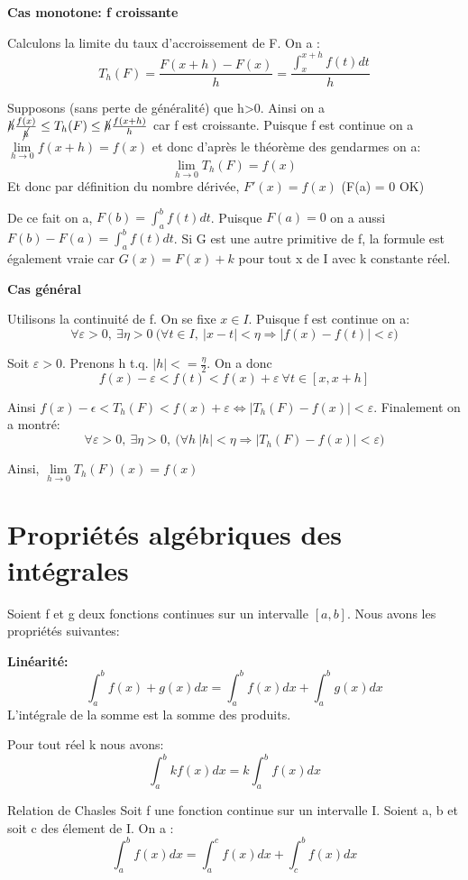 \begin{Proof}
  \textbf{Cas monotone: f croissante}

  Calculons la limite du taux d'accroissement de F. On a :
  \[
    T_h(F) = \frac{F(x+h)-F(x)}{h} = \frac{\int_x^{x+h} f(t) dt}{h}
  \]

  Supposons (sans perte de généralité) que h>0. Ainsi on a $\cancel{h}
  \frac{f(x)}{\cancel{h}} \leq T_h(F) \leq \cancel h \frac{f(x+h)}{h}$
  car f est croissante. Puisque f est continue on a $\lim
  \limits_{h\to 0} f(x+h) = f(x)$ et donc d'après le théorème des
  gendarmes on a:
  \[
    \lim \limits_{h \to 0} T_h(F) = f(x)
  \]
  Et donc par définition du nombre dérivée, $F'(x) = f(x)$ (F(a) = 0 OK)

  De ce fait on a, $F(b) = \int_a^b f(t) dt$. Puisque $F(a) = 0$ on a
  aussi $F(b)-F(a) = \int_a^b f(t)dt$. Si G est une autre primitive de
  f, la formule est également vraie car $G(x) = F(x)+k$ pour tout x de
  I avec k constante réel.

  \textbf{Cas général}
  
  Utilisons la continuité de f. On se fixe $x \in I$. Puisque f est continue on a:
  \[
    \forall \varepsilon>0, ~ \exists \eta>0 ~\big( \forall t \in I,~ |x-t|<\eta
    \Rightarrow |f(x)-f(t)|<\varepsilon \big)
  \]

  Soit $\varepsilon >0$. Prenons h t.q. $|h|<=\frac{\eta}{2}$. On a donc
  \[
    f(x) - \varepsilon < f(t) < f(x) + \varepsilon ~ \forall t \in [x,x+h]
  \]

  Ainsi $f(x)-\epsilon < T_h(F) < f(x)+\varepsilon \Leftrightarrow
  |T_h(F) - f(x)| < \varepsilon $. Finalement on a montré:
  \[
    \forall \varepsilon > 0, ~ \exists \eta>0,~\big( \forall h ~ |h| < \eta
    \Rightarrow |T_h(F) - f(x)|<\varepsilon \big) 
  \]

  Ainsi, $\lim \limits_{h \to 0} T_h(F)(x) = f(x)$
\end{Proof}

\section{Propriétés algébriques des intégrales}
Soient f et g deux fonctions continues sur un intervalle $[a,b]$. Nous avons les
propriétés suivantes: 

\textbf{Linéarité: }
\[
  \int_a^b f(x) + g(x) dx = \int_a^b f(x) dx + \int_a^b g(x)dx
\]
L'intégrale de la somme est la somme des produits.

Pour tout réel k nous avons:
\[
  \int_a^b kf(x)dx = k\int_a^b f(x)dx
\]

\begin{prop}{Relation de Chasles}
  Soit f une fonction continue sur un intervalle I. Soient a, b et soit c des
  élement de I. On a :
  \[
    \int_a^b f(x) dx = \int_a^c f(x)dx + \int_c^b f(x)dx
  \]
\end{prop}

